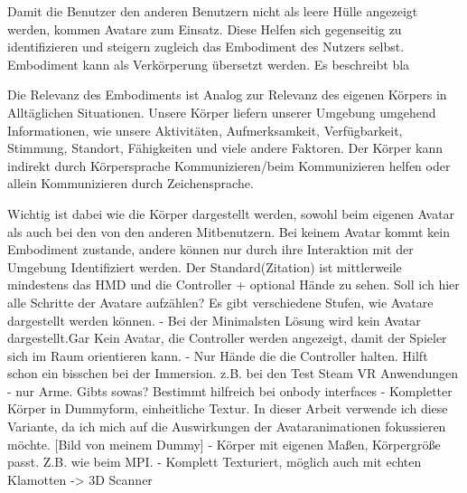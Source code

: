 Damit die Benutzer den anderen Benutzern nicht als leere Hülle angezeigt werden, kommen Avatare zum Einsatz. Diese Helfen sich gegenseitig zu identifizieren und steigern zugleich das Embodiment des Nutzers selbst. Embodiment kann als Verkörperung übersetzt werden. Es beschreibt bla

Die Relevanz des Embodiments ist Analog zur Relevanz des eigenen Körpers in Alltäglichen Situationen. Unsere Körper liefern unserer Umgebung umgehend Informationen, wie unsere Aktivitäten, Aufmerksamkeit, Verfügbarkeit, Stimmung, Standort, Fähigkeiten und viele andere Faktoren. Der Körper kann indirekt durch Körpersprache Kommunizieren/beim Kommunizieren helfen oder allein Kommunizieren durch Zeichensprache.\cite{Benford2010}

Wichtig ist dabei wie die Körper dargestellt werden, sowohl beim eigenen Avatar als auch bei den von den anderen Mitbenutzern. Bei keinem Avatar kommt kein Embodiment zustande, andere können nur durch ihre Interaktion mit der Umgebung Identifiziert werden. Der Standard(Zitation) ist mittlerweile mindestens das HMD und die Controller + optional Hände zu sehen. \cite{Benford2010}
Soll ich hier alle Schritte der Avatare aufzählen?
Es gibt verschiedene Stufen, wie Avatare dargestellt werden können.
- Bei der Minimalsten Lösung wird kein Avatar dargestellt.Gar Kein Avatar, die Controller werden angezeigt, damit der Spieler sich im Raum orientieren kann.
- Nur Hände die die Controller halten. Hilft schon ein bisschen bei der Immersion. z.B. bei den Test Steam VR Anwendungen
- nur Arme. Gibts sowas? Bestimmt hilfreich bei onbody interfaces
- Kompletter Körper in Dummyform, einheitliche Textur. In dieser Arbeit verwende ich diese Variante, da ich mich auf die Auswirkungen der Avataranimationen fokussieren möchte. 
[Bild von meinem Dummy]
- Körper mit eigenen Maßen, Körpergröße passt. Z.B. wie beim MPI. 
- Komplett Texturiert, möglich auch mit echten Klamotten -> 3D Scanner
